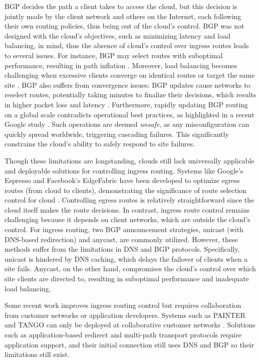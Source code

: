 \documentclass[sigconf,nonacm,screen,letterpaper,9pt]{acmart}
\begin{document}
BGP decides the path a client takes to access the cloud, but this
decision is jointly made by the client network and others on the
Internet, each following their own routing policies, thus being out of
the cloud's control. BGP was not designed with the cloud's objectives,
such as minimizing latency and load balancing, in mind, thus the absence
of cloud's control over ingress routes leads to several issues. For
instance, BGP may select routes with suboptimal performance, resulting
in path inflation
\cite{painter, anycast_matt, anycast_ppp, imc-jc-deanony, tango}.
Moreover, load balancing becomes challenging when excessive clients
converge on identical routes or target the same site
\cite{tipsy, flavel2015fastroute}. BGP also suffers from convergence
issues: BGP updates cause networks to reselect routes, potentially
taking minutes to finalize their decisions, which results in higher
packet loss and latency
\cite{bgp-conv, a-measurement-study-on-the-impact}. Furthermore, rapidly
updating BGP routing on a global scale contradicts operational best
practices, as highlighted in a recent Google study \cite{capa}. Such
operations are deemed \emph{unsafe}, as any misconfiguration can quickly
spread worldwide, triggering cascading failures. This significantly
constrains the cloud's ability to safely respond to site failures.

Though these limitations are longstanding, clouds still lack universally
applicable and deployable solutions for controlling ingress routing.
Systems like Google's Espresso and Facebook's EdgeFabric have been
developed to optimize egress routes (from cloud to clients),
demonstrating the significance of route selection control for cloud
\cite{yap2017taking, schlinker2017engineering}. Controlling egress
routes is relatively straightforward since the cloud itself makes the
route decisions. In contrast, ingress route control remains challenging
because it depends on client networks, which are outside the cloud's
control. For ingress routing, two BGP announcement strategies, unicast
(with DNS-based redirection) and anycast, are commonly utilized.
However, these methods suffer from the limitations in DNS and BGP
protocols. Specifically, unicast is hindered by DNS caching, which
delays the failover of clients when a site fails. Anycast, on the other
hand, compromises the cloud's control over which site clients are
directed to, resulting in suboptimal performance and inadequate load
balancing.

Some recent work improves ingress routing control but requires
collaboration from customer networks or application developers. Systems
such as PAINTER and TANGO can only be deployed at collaborative customer
networks \cite{painter,tango-nsdi}. Solutions such as application-based
redirect and multi-path transport protocols require application support,
and their initial connection still uses DNS and BGP so their limitations
still exist.
\end{document}
